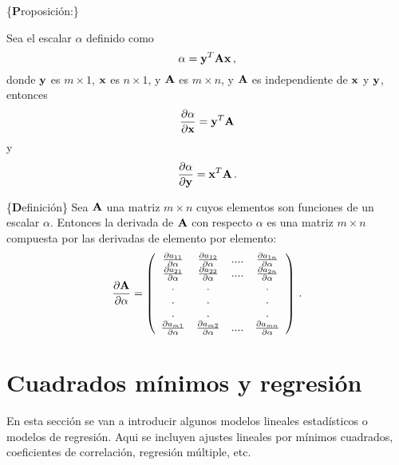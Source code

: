 \documentclass[
]{agujournal2019}
\begin{document}
\vspace{0.5cm}

\{\noindent \textbf Proposición:\}

\noindent Sea el escalar \(\alpha\) definido como
\[\alpha={\textbf y}^T{\textbf A}{\textbf x}\,,\] donde \({\textbf y}\)
es \(m\times 1\), \({\textbf x}\) es \(n\times 1\), y \({\textbf A}\) es
\(m\times n\), y \({\textbf A}\) es independiente de \({\textbf x}\) y
\({\textbf y}\), entonces
\[\frac{\partial{\alpha}}{\partial{{\textbf x}}}={\textbf y}^T{\textbf A}\]
y
\[\frac{\partial{\alpha}}{\partial{{\textbf y}}}={\textbf x}^T{\textbf A}\,.\]

\vspace{0.5cm}

\{\noindent \textbf Definición\} Sea \({\textbf A}\) una matriz
\(m\times n\) cuyos elementos son funciones de un escalar \(\alpha\).
Entonces la derivada de \({\textbf A}\) con respecto \(\alpha\) es una
matriz \(m\times n\) compuesta por las derivadas de elemento por
elemento:
\[\frac{\partial{\textbf A}}{\partial{\alpha}}=\left(\begin{array}{cccc}
  \frac{\partial{a_{11}}}{\partial{\alpha}} & \frac{\partial{a_{12}}}{\partial{\alpha}} & .... &
   \frac{\partial{a_{1n}}}{\partial{\alpha}}\\
  \frac{\partial{a_{21}}}{\partial{\alpha}} & \frac{\partial{a_{22}}}{\partial{\alpha}} & .... &
   \frac{\partial{a_{2n}}}{\partial{\alpha}}\\
    .    &   .    &      &   . \\
    .    &   .    &      &   . \\
    .    &   .    &      &   . \\
  \frac{\partial{a_{m1}}}{\partial{\alpha}} & \frac{\partial{a_{m2}}}{\partial{\alpha}} & .... &
   \frac{\partial{a_{mn}}}{\partial{\alpha}}\\
\end{array}
  \right)
\,.\]

\hypertarget{cuadrados-muxednimos-y-regresiuxf3n}{%
\section{Cuadrados mínimos y
regresión}\label{cuadrados-muxednimos-y-regresiuxf3n}}

\noindent En esta sección se van a introducir algunos modelos lineales
estadísticos o modelos de regresión. Aqui se incluyen ajustes lineales
por mínimos cuadrados, coeficientes de correlación, regresión múltiple,
etc.
\end{document}
